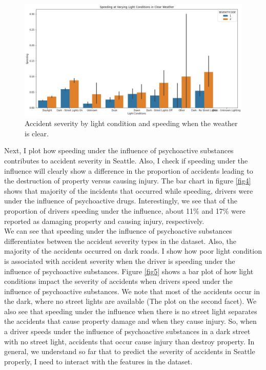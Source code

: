 \documentclass[a4paper,12pt]{article}
\begin{document}
\begin{figure}[H]
	\centering
	\includegraphics[width=1.0\textwidth]{li_sp_wet.jpg}
	\caption{Accident severity by light condition and speeding when the weather is clear.}
	\label{fig3}
\end{figure}

Next, I plot how speeding under the influence of psychoactive substances contributes to accident severity in Seattle. Also, I check if speeding under the influence will clearly show a difference in the proportion of accidents leading to the destruction of property versus causing injury. The bar chart in figure \ref{fig4} shows that majority of the incidents that occurred while speeding, drivers were under the influence of psychoactive drugs. Interestingly, we see that of the proportion of drivers speeding under the influence, about 11\% and 17\% were reported as damaging property and causing injury, respectively. \\

We can see that speeding under the influence of psychoactive substances differentiates between the accident severity types in the dataset. Also, the majority of the accidents occurred on dark roads. I show how poor light condition is associated with accident severity when the driver is speeding under the influence of psychoactive substances. Figure \ref{fig5} shows a bar plot of how light conditions impact the severity of accidents when drivers speed under the influence of psychoactive substances. We note that most of the accidents occur in the dark, where no street lights are available (The plot on the second facet). We also see that speeding under the influence when there is no street light separates the accidents that cause property damage and when they cause injury. So, when a driver speeds under the influence of psychoactive substances in a dark street with no street light, accidents that occur cause injury than destroy property. In general, we understand so far that to predict the severity of accidents in Seattle properly, I need to interact with the features in the dataset. \\
\end{document}
